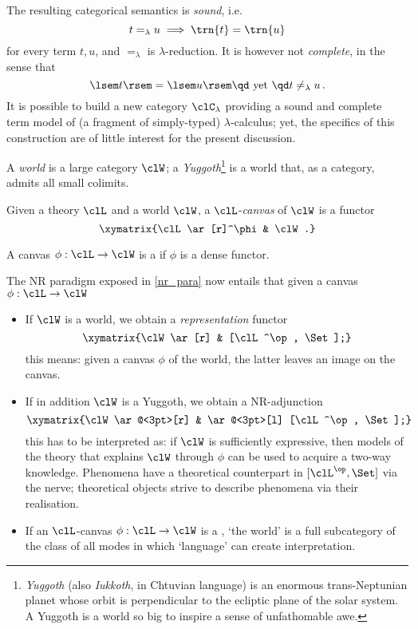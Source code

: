 The resulting categorical semantics is \emph{sound}, i.e.
\[ t=_\lambda u \implies \trn{t}=\trn{u} \]
for every term $t,u$, and $=_\lambda$ is $\lambda$-reduction. It is however not \emph{complete}, in the sense that
\[ \lsem t \rsem = \lsem u \rsem \text{\qd yet \qd} t\neq_\lambda u\,. \]
It is possible to build a new category $\clC_\lambda$ providing a sound and complete term model of (a fragment of simply-typed) $\lambda$-calculus; yet, the specifics of this construction are of little interest for the present discussion.
\begin{definition}\label{mondo_yalda}
	A \emph{world} is a large category $\clW$; a \emph{Yuggoth}\footnote{\emph{Yuggoth} (also \emph{Iukkoth}, {\yugg} in Chtuvian language) is an enormous trans-Neptunian planet whose orbit is perpendicular to the ecliptic plane of the solar system. A Yuggoth is a world so big to inspire a sense of unfathomable awe.} is a world that, as a category, admits all small colimits.
\end{definition}
\begin{definition}\label{canvas_scienza}
	Given a theory $\clL$ and a world $\clW$, a $\clL$-\emph{canvas} of $\clW$ is a functor
	\[\xymatrix{\clL \ar[r]^\phi & \clW.}\]
	
	A canvas $\phi : \clL \to \clW$ is a \emph{\science} if $\phi$ is a dense functor.
\end{definition}
	\begin{remark}\label{remark_yuggoth_1}
	The NR paradigm exposed in \autoref{nr_para} now entails that given a canvas $\phi : \clL \to \clW$
	\begin{itemize}
		\item If $\clW$ is a world, we obtain a \emph{representation} functor
		      \[ \xymatrix{\clW \ar[r] & [\clL^\op, \Set];} \label{mvndvs}\]
		      this means: given a canvas $\phi$ of the world, the latter leaves an image on the canvas.
		\item If in addition $\clW$ is a Yuggoth, we obtain a NR-adjunction
		      \[\xymatrix{\clW \ar@<3pt>[r] & \ar@<3pt>[l] [\clL^\op, \Set];}\]
		      this has to be interpreted as: if $\clW$ is sufficiently expressive, then models of the theory that explains $\clW$ through $\phi$ can be used to acquire a two-way knowledge. Phenomena have a theoretical counterpart in $[\clL^\op,\Set]$ via the nerve; theoretical objects strive to describe phenomena via their realisation.
		\item If an $\clL$-canvas $\phi : \clL \to \clW$ is a \science, `the world' is a full subcategory of the class of all modes in which `language' can create interpretation.
	\end{itemize}
\end{remark}
